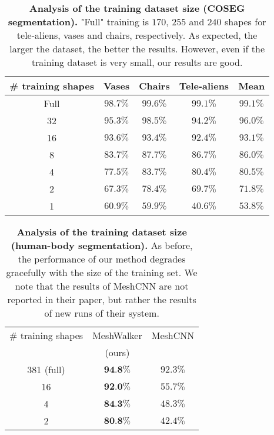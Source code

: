 \documentclass[acmtog]{acmart}
\begin{document}
\begin{table}[htb]\caption{{\bf Analysis of the training dataset size (COSEG segmentation).} 
"Full" training is $170$, $255$ and $240$ shapes for tele-aliens, vases and chairs, respectively.
As expected, the larger the dataset, the better the results.
However, even if the training dataset is very small, our results are good.
}
\begin{center}
 \begin{tabular}{||c c c c c||} 
 \hline
 \# training shapes & Vases & Chairs & Tele-aliens & Mean \\ [0.5ex] 
 \hline\hline\hline
 Full & $98.7\%$ & $99.6\%$ & $99.1\%$ & $99.1\%$ \\ 
 \hline\hline
 32         & $95.3\%$ & $98.5\%$ & $94.2\%$ & $96.0\%$ \\
 \hline
 16         & $93.6\%$ & $93.4\%$ & $92.4\%$ & $93.1\%$ \\
 \hline
 8          & $83.7\%$ & $87.7\%$ & $86.7\%$ & $86.0\%$ \\
 \hline
 4          & $77.5\%$ & $83.7\%$ & $80.4\%$ & $80.5\%$ \\
 \hline
 2          & $67.3\%$ & $78.4\%$ & $69.7\%$ & $71.8\%$ \\
 \hline
 1          & $60.9\%$ & $59.9\%$ & $40.6\%$ & $53.8\%$ \\
 \hline
\end{tabular}
\label{tbl:train_size_alien_coseg}
\end{center}
\end{table}

\begin{table}[htb]\caption{{\bf Analysis of the training dataset size (human-body segmentation).}
As before, the performance of our method degrades gracefully with the size of the training set.
We note that the results of MeshCNN are not reported in their paper, but rather the results of  new runs of their system.
}
\begin{center}
 \begin{tabular}{||c c c||} 
 \hline
 \# training shapes & MeshWalker & MeshCNN \\ [0.5ex] 
   & (ours) & \cite{hanocka2019meshcnn} \\
\hline\hline\hline
 381 (full) & $\textbf{94.8\%}$ & $92.3\%$ \\ 
 \hline\hline
 16 & $\textbf{92.0\%}$ & $55.7\%$ \\
 \hline
 4 & $\textbf{84.3\%}$ & $48.3\%$ \\
 \hline
 2 & $\textbf{80.8\%}$ & $42.4\%$ \\
 \hline
\end{tabular}
\label{tbl:train_size_human_body}
\end{center}
\end{table}
\end{document}
